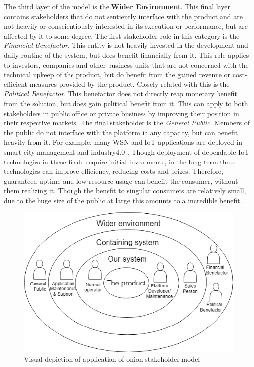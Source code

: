 The third layer of the model is the \textbf{Wider Environment}. This final layer contains stakeholders that do not sentiently interface with the product and are not heavily or conscientiously interested in its execution or performance, but are affected by it to some degree. The first stakeholder role in this category is the \emph{Financial Benefactor}. This entity is not heavily invested in the development and daily routine of the system, but does benefit financially from it. This role applies to investors, companies and other business units that are not concerned with the technical upkeep of the product, but do benefit from the gained revenue or cost-efficient measures provided by the product. Closely related with this is the \emph{Political Benefactor}. This benefactor does not directly reap monetary benefit from the solution, but does gain political benefit from it. This can apply to both stakeholders in public office or private business by improving their position in their respective markets. The final stakeholder is the \emph{General Public}. Members of the public do not interface with the platform in any capacity, but can benefit heavily from it. For example, many WSN and IoT applications are deployed in smart city management \cite{example_smart_city} and industry4.0 \cite{example_industry}. Though deployment of dependable IoT technologies in these fields require initial investments, in the long term these technologies can improve efficiency, reducing costs and prizes. Therefore, guaranteed uptime and low resource usage can benefit the consumer, without them realizing it. Though the benefit to singular consumers are relatively small, due to the huge size of the public at large this amounts to a incredible benefit.

\begin{figure}
\centering
\includegraphics[width=.7\textwidth]{resources/img/onion.png}
\caption{Visual depiction of application of onion stakeholder model}
\label{fig:onion}
\end{figure}
